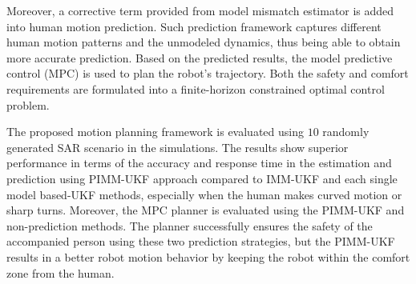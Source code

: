 \documentclass[journal]{IEEEtran}
\DeclareRobustCommand{\clnote}[1]{\ifthenelse{\boolean{include-notes}}%
{\textcolor{orange}{\textbf{CL: #1}}}{}}
\begin{document}
	Moreover, a corrective term provided from model mismatch estimator is added into human motion prediction.
        Such prediction framework captures different human motion patterns and the unmodeled dynamics, thus being able to obtain more accurate prediction.
	Based on the predicted results, the model predictive control (MPC) is used to plan the robot's trajectory. Both the safety and comfort requirements are formulated into a finite-horizon constrained optimal control problem.

	The proposed motion planning framework is evaluated using $10$ randomly generated SAR scenario in the simulations.
	The results show superior performance in terms of the accuracy and response time in the estimation and prediction using PIMM-UKF approach compared to IMM-UKF and each
    single model based-UKF methods, especially when the human makes curved motion or sharp turns.
	Moreover, the MPC planner is evaluated using the PIMM-UKF and non-prediction methods.
	The planner successfully ensures the safety of the accompanied person using these two prediction strategies, but the PIMM-UKF results in a better robot motion behavior by keeping the robot within the comfort zone from the human.
	
\end{document}
